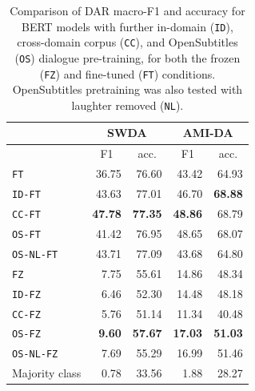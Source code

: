 \documentclass[11pt,a4paper]{article}
\begin{document}
\begin{table}[]
\begin{tabular}{@{}lrrrr@{}}
\toprule
           & \multicolumn{2}{c}{SWDA}                          & \multicolumn{2}{c}{AMI-DA}                        \\ \midrule
           & \multicolumn{1}{c}{F1} & \multicolumn{1}{c}{acc.} & \multicolumn{1}{c}{F1} & \multicolumn{1}{c}{acc.} \\
\texttt{FT}    & 36.75                  & 76.60                    & 43.42                  & 64.93                    \\
\texttt{ID-FT} & 43.63                  & 77.01                    & 46.70                  & \textbf{68.88}           \\
\texttt{CC-FT} & \textbf{47.78}         & \textbf{77.35}           & \textbf{48.86}         & 68.79                    \\ 
\texttt{OS-FT} & 41.42                  & 76.95                    & 48.65                  & 68.07                    \\ 
\texttt{OS-NL-FT} & 43.71                  & 77.09                    & 43.68                  & 64.80                    \\ \midrule

\texttt{FZ}    &  7.75                  & 55.61           & 14.86                  & 48.34                    \\
\texttt{ID-FZ} &  6.46                  & 52.30                    & 14.48                  & 48.18                    \\
\texttt{CC-FZ} &  5.76                  & 51.14                    & 11.34                  & 40.48                    \\ 
\texttt{OS-FZ} &  \textbf{9.60}         & \textbf{57.67}           & \textbf{17.03}         & \textbf{51.03}           \\ 
\texttt{OS-NL-FZ} & 7.69                  & 55.29                    & 16.99                  & 51.46                    \\ \midrule
\midrule
    Majority class  & 0.78                   & 33.56                    &  1.88                  & 28.27      \\ \bottomrule
\end{tabular}
\caption{Comparison of DAR macro-F1 and accuracy for BERT models with further in-domain (\texttt{ID}), cross-domain corpus (\texttt{CC}), and OpenSubtitles (\texttt{OS}) dialogue pre-training,
for both the frozen (\texttt{FZ}) and fine-tuned (\texttt{FT}) conditions. OpenSubtitles pretraining was also tested with laughter removed (\texttt{NL}).}
  \label{tab:results}
\end{table}
\end{document}
